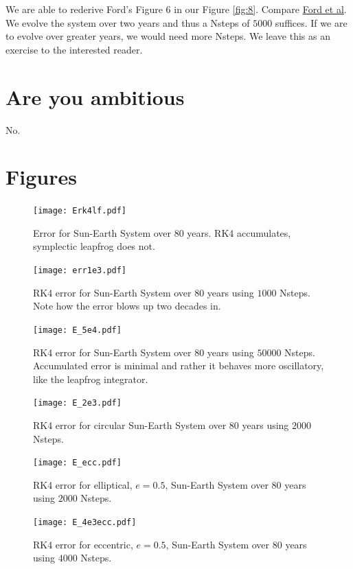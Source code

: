 \documentclass[11pt,letterpaper]{article}
\begin{document}
We are able to rederive Ford's Figure 6 in our Figure \ref{fig:8}. Compare \href{http://iopscience.iop.org/0004-637X/535/1/385/pdf/40691.web.pdf}{Ford et al}. We evolve the system over two years and thus a Nsteps of $5000$ suffices. If we are to evolve over greater years, we would need more Nsteps. We leave this as an exercise to the interested reader.

\section{Are you ambitious}
No.\newpage
\section{Figures}
\begin{figure}[bth]
\centering
\texttt{[image: Erk4lf.pdf]}
\caption{Error for Sun-Earth System over 80 years. RK4 accumulates, symplectic leapfrog does not.}
\label{fig:1}
\end{figure}

\begin{figure}[bth]
\centering
\texttt{[image: err1e3.pdf]}
\caption{RK4 error for Sun-Earth System over 80 years using $1000$ Nsteps. Note how the error blows up two decades in.}
\label{fig:2}
\end{figure}

\begin{figure}[bth]
\centering
\texttt{[image: E\_5e4.pdf]}
\caption{RK4 error for Sun-Earth System over 80 years using $50000$ Nsteps. Accumulated error is minimal and rather it behaves more oscillatory, like the leapfrog integrator.}
\label{fig:3}
\end{figure}

\begin{figure}[bth]
\centering
\texttt{[image: E\_2e3.pdf]}
\caption{RK4 error for circular Sun-Earth System over 80 years using $2000$ Nsteps.}
\label{fig:4}
\end{figure}

\begin{figure}[bth]
\centering
\texttt{[image: E\_ecc.pdf]}
\caption{RK4 error for elliptical, $e=0.5$,  Sun-Earth System over 80 years using $2000$ Nsteps.}
\label{fig:5}
\end{figure}

\begin{figure}[bth]
\centering
\texttt{[image: E\_4e3ecc.pdf]}
\caption{RK4 error for eccentric, $e=0.5$, Sun-Earth System over 80 years using $4000$ Nsteps.}
\label{fig:6}
\end{figure}
\end{document}
